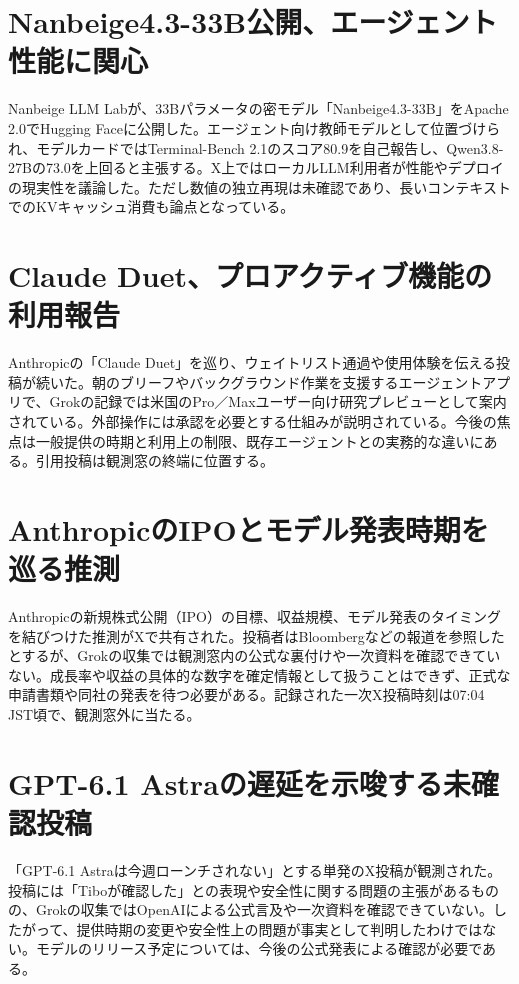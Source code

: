 \section{Nanbeige4.3-33B公開、エージェント性能に関心}
Nanbeige LLM Labが、33Bパラメータの密モデル「Nanbeige4.3-33B」をApache 2.0でHugging Faceに公開した。エージェント向け教師モデルとして位置づけられ、モデルカードではTerminal-Bench 2.1のスコア80.9を自己報告し、Qwen3.8-27Bの73.0を上回ると主張する。X上ではローカルLLM利用者が性能やデプロイの現実性を議論した。ただし数値の独立再現は未確認であり、長いコンテキストでのKVキャッシュ消費も論点となっている。

\section{Claude Duet、プロアクティブ機能の利用報告}
Anthropicの「Claude Duet」を巡り、ウェイトリスト通過や使用体験を伝える投稿が続いた。朝のブリーフやバックグラウンド作業を支援するエージェントアプリで、Grokの記録では米国のPro／Maxユーザー向け研究プレビューとして案内されている。外部操作には承認を必要とする仕組みが説明されている。今後の焦点は一般提供の時期と利用上の制限、既存エージェントとの実務的な違いにある。引用投稿は観測窓の終端に位置する。

\section{AnthropicのIPOとモデル発表時期を巡る推測}
Anthropicの新規株式公開（IPO）の目標、収益規模、モデル発表のタイミングを結びつけた推測がXで共有された。投稿者はBloombergなどの報道を参照したとするが、Grokの収集では観測窓内の公式な裏付けや一次資料を確認できていない。成長率や収益の具体的な数字を確定情報として扱うことはできず、正式な申請書類や同社の発表を待つ必要がある。記録された一次X投稿時刻は07:04 JST頃で、観測窓外に当たる。

\section{GPT-6.1 Astraの遅延を示唆する未確認投稿}
「GPT-6.1 Astraは今週ローンチされない」とする単発のX投稿が観測された。投稿には「Tiboが確認した」との表現や安全性に関する問題の主張があるものの、Grokの収集ではOpenAIによる公式言及や一次資料を確認できていない。したがって、提供時期の変更や安全性上の問題が事実として判明したわけではない。モデルのリリース予定については、今後の公式発表による確認が必要である。

